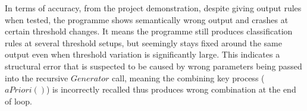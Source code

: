 In terms of accuracy, from the project demonstration, despite giving output rules when tested, the programme shows semantically wrong output and crashes at certain threshold changes. It means the programme still produces classification rules at several threshold setups, but seemingly stays fixed around the same output even when threshold variation is significantly large. This indicates a structural error that is suspected to be caused by wrong parameters being passed into the recursive $Generator$ call, meaning the combining key process ($aPriori()$) is incorrectly recalled thus produces wrong combination at the end of loop.




